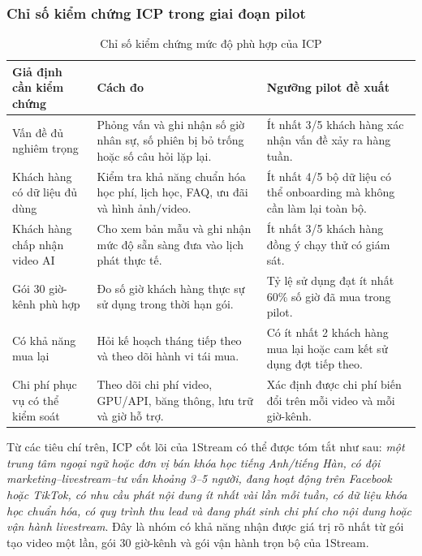 \subsubsection{Chỉ số kiểm chứng ICP trong giai đoạn pilot}

\begin{table}[H]
    \centering
    \small
    \setlength{\tabcolsep}{4pt}
    \renewcommand{\arraystretch}{1.25}
    \caption{Chỉ số kiểm chứng mức độ phù hợp của ICP}
    \label{tab:icp-validation-metrics}
    \begin{tabularx}{\linewidth}{@{}L{3.0cm}Y L{3.1cm}@{}}
        \toprule
        \textbf{Giả định cần kiểm chứng} & \textbf{Cách đo} & \textbf{Ngưỡng pilot đề xuất} \\ \midrule
        Vấn đề đủ nghiêm trọng & Phỏng vấn và ghi nhận số giờ nhân sự, số phiên
        bị bỏ trống hoặc số câu hỏi lặp lại. &
        Ít nhất 3/5 khách hàng xác nhận vấn đề xảy ra hàng tuần. \\
        Khách hàng có dữ liệu đủ dùng & Kiểm tra khả năng chuẩn hóa học phí, lịch
        học, FAQ, ưu đãi và hình ảnh/video. &
        Ít nhất 4/5 bộ dữ liệu có thể onboarding mà không cần làm lại toàn bộ. \\
        Khách hàng chấp nhận video AI & Cho xem bản mẫu và ghi nhận mức độ sẵn
        sàng đưa vào lịch phát thực tế. &
        Ít nhất 3/5 khách hàng đồng ý chạy thử có giám sát. \\
        Gói 30 giờ-kênh phù hợp & Đo số giờ khách hàng thực sự sử dụng trong
        thời hạn gói. &
        Tỷ lệ sử dụng đạt ít nhất 60\% số giờ đã mua trong pilot. \\
        Có khả năng mua lại & Hỏi kế hoạch tháng tiếp theo và theo dõi hành vi
        tái mua. &
        Có ít nhất 2 khách hàng mua lại hoặc cam kết sử dụng đợt tiếp theo. \\
        Chi phí phục vụ có thể kiểm soát & Theo dõi chi phí video, GPU/API, băng
        thông, lưu trữ và giờ hỗ trợ. &
        Xác định được chi phí biến đổi trên mỗi video và mỗi giờ-kênh. \\ \bottomrule
    \end{tabularx}
\end{table}

Từ các tiêu chí trên, ICP cốt lõi của 1Stream có thể được tóm tắt như sau:
\textit{một trung tâm ngoại ngữ hoặc đơn vị bán khóa học tiếng Anh/tiếng Hàn,
có đội marketing--livestream--tư vấn khoảng 3--5 người, đang hoạt động trên
Facebook hoặc TikTok, có nhu cầu phát nội dung ít nhất vài lần mỗi tuần, có dữ
liệu khóa học chuẩn hóa, có quy trình thu lead và đang phát sinh chi phí cho
nội dung hoặc vận hành livestream}. Đây là nhóm có khả năng nhận được giá trị
rõ nhất từ gói tạo video một lần, gói 30 giờ-kênh và gói vận hành trọn bộ của
1Stream.
